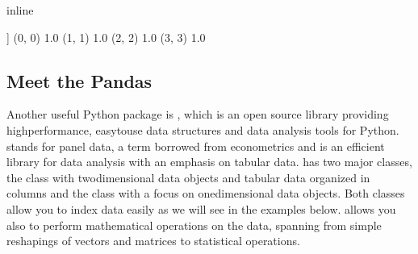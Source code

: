 \documentclass[letterpaper,10pt,english]{sphinxmanual}
\begin{document}
\begin{sphinxVerbatim}[commandchars=\\\{\}]
 inline

   
   
   
  
  
  
  
\end{sphinxVerbatim}

\begin{sphinxVerbatim}[commandchars=\\\{\}]
[[1. 0. 0. 0.]
 [0. 1. 0. 0.]
 [0. 0. 1. 0.]
 [0. 0. 0. 1.]]
  (0, 0)	1.0
  (1, 1)	1.0
  (2, 2)	1.0
  (3, 3)	1.0
\end{sphinxVerbatim}

\noindent{}


\subsection{Meet the Pandas}
\label{\detokenize{chapter2:meet-the-pandas}}








Another useful Python package is
, which is an open source library
providing high\sphinxhyphen{}performance, easy\sphinxhyphen{}to\sphinxhyphen{}use data structures and data
analysis tools for Python.  stands for panel data, a term borrowed from econometrics and is an efficient library for data analysis with an emphasis on tabular data.
 has two major classes, the  class with two\sphinxhyphen{}dimensional data objects and tabular data organized in columns and the class  with a focus on one\sphinxhyphen{}dimensional data objects. Both classes allow you to index data easily as we will see in the examples below.
 allows you also to perform mathematical operations on the data, spanning from simple reshapings of vectors and matrices to statistical operations.
\end{document}
